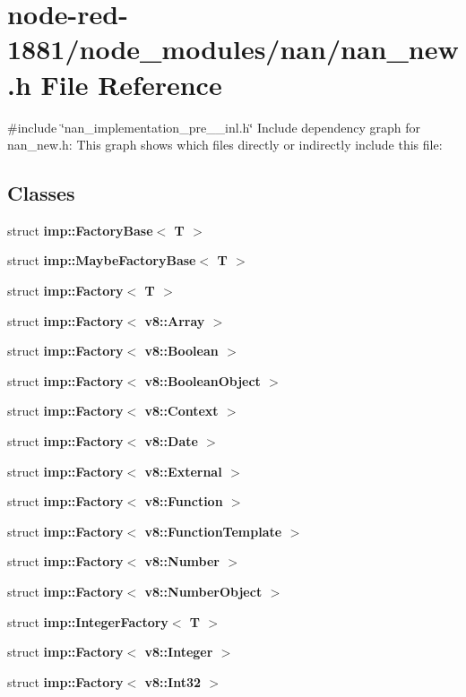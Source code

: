 \section{node-\/red-\/1881/node\+\_\+modules/nan/nan\+\_\+new.h File Reference}
\label{nan__new_8h}
{\ttfamily \#include \char`\"{}nan\+\_\+implementation\+\_\+pre\+\_\+\_\+inl.\+h\char`\"{}}\newline
Include dependency graph for nan\+\_\+new.\+h\+:
This graph shows which files directly or indirectly include this file\+:
\subsection*{Classes}
\begin{DoxyCompactItemize}
\item 
struct \textbf{ imp\+::\+Factory\+Base$<$ T $>$}
\item 
struct \textbf{ imp\+::\+Maybe\+Factory\+Base$<$ T $>$}
\item 
struct \textbf{ imp\+::\+Factory$<$ T $>$}
\item 
struct \textbf{ imp\+::\+Factory$<$ v8\+::\+Array $>$}
\item 
struct \textbf{ imp\+::\+Factory$<$ v8\+::\+Boolean $>$}
\item 
struct \textbf{ imp\+::\+Factory$<$ v8\+::\+Boolean\+Object $>$}
\item 
struct \textbf{ imp\+::\+Factory$<$ v8\+::\+Context $>$}
\item 
struct \textbf{ imp\+::\+Factory$<$ v8\+::\+Date $>$}
\item 
struct \textbf{ imp\+::\+Factory$<$ v8\+::\+External $>$}
\item 
struct \textbf{ imp\+::\+Factory$<$ v8\+::\+Function $>$}
\item 
struct \textbf{ imp\+::\+Factory$<$ v8\+::\+Function\+Template $>$}
\item 
struct \textbf{ imp\+::\+Factory$<$ v8\+::\+Number $>$}
\item 
struct \textbf{ imp\+::\+Factory$<$ v8\+::\+Number\+Object $>$}
\item 
struct \textbf{ imp\+::\+Integer\+Factory$<$ T $>$}
\item 
struct \textbf{ imp\+::\+Factory$<$ v8\+::\+Integer $>$}
\item 
struct \textbf{ imp\+::\+Factory$<$ v8\+::\+Int32 $>$}
\item 

\end{DoxyCompactItemize}

